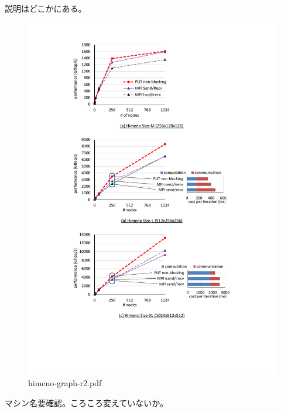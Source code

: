 説明はどこかにある。

\begin{figure}[p]
  \begin{center}
    \mbox{\includegraphics[trim=37mm 34mm 37mm 4mm, scale=0.8,clip]{figs/himeno-graph-r2.pdf}}
    \caption{himeno-graph-r2.pdf}\label{fig:himeno-graph}
  \end{center}
\end{figure}


マシン名要確認。ころころ変えていないか。






